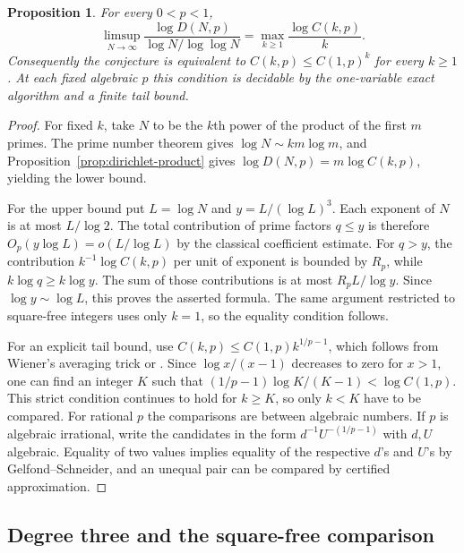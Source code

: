 \documentclass[11pt]{article}
\newtheorem{proposition}[theorem]{Proposition}
\begin{document}
\begin{proposition}\label{prop:extremal-prime-power}
For every \(0<p<1\),
\[
 \limsup_{N\to\infty}
       \frac{\log D(N,p)}{\log N/\log\log N}
   =\max_{k\geq1}\frac{\log C(k,p)}{k}.
\]
Consequently the conjecture is equivalent to
\(C(k,p)\leq C(1,p)^k\) for every \(k\geq1\). At each fixed
algebraic \(p\) this condition is decidable by the
one-variable exact algorithm and a finite tail bound.
\end{proposition}

\begin{proof}
For fixed \(k\), take \(N\) to be the \(k\)th power of the
product of the first \(m\) primes. The prime number theorem
gives \(\log N\sim km\log m\), and
Proposition~\ref{prop:dirichlet-product} gives
\(\log D(N,p)=m\log C(k,p)\), yielding the lower bound.

For the upper bound put \(L=\log N\) and
\(y=L/(\log L)^3\). Each exponent of \(N\) is at most
\(L/\log 2\). The total contribution of prime factors
\(q\leq y\) is therefore \(O_p(y\log L)=o(L/\log L)\)
by the classical coefficient estimate. For \(q>y\), the
contribution \(k^{-1}\log C(k,p)\) per unit of exponent
is bounded by \(R_p\), while \(k\log q\geq k\log y\).
The sum of those contributions is at most \(R_pL/\log y\).
Since \(\log y\sim\log L\), this proves the asserted formula.
The same argument restricted to square-free integers uses
only \(k=1\), so the equality condition follows.

For an explicit tail bound, use
\(C(k,p)\leq C(1,p)k^{1/p-1}\), which follows from Wiener's
averaging trick or \cite[Section~5]{BrevigSaksman}. Since
\(\log x/(x-1)\) decreases to zero for \(x>1\), one can find
an integer \(K\) such that
\((1/p-1)\log K/(K-1)<\log C(1,p)\). This strict condition
continues to hold for \(k\geq K\), so only \(k<K\) have to be
compared. For rational \(p\) the comparisons are between
algebraic numbers. If \(p\) is algebraic irrational, write
the candidates in the form \(d^{-1}U^{-(1/p-1)}\) with
\(d,U\) algebraic. Equality of two values implies equality
of the respective \(d\)'s and \(U\)'s by
Gelfond--Schneider, and an unequal pair can be compared by
certified approximation.
\end{proof}

\subsection{Degree three and the square-free comparison}
\label{sec:cubic-domination}
\end{document}
